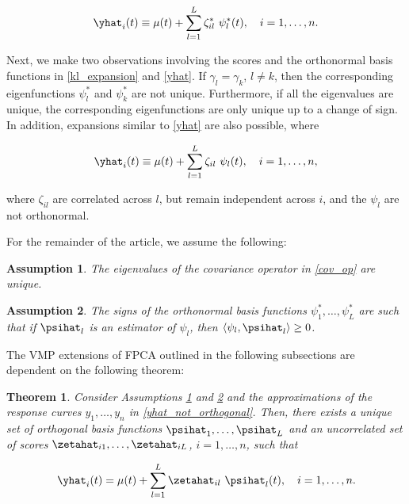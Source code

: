 \documentclass[12pt]{article}
\theoremstyle{plain}
\newtheorem{theorem}{Theorem}[section]
\newtheorem{assumption}{Assumption}
\theoremstyle{definition}
\theoremstyle{remark}
\begin{document}
\begin{equation}
	\yhat_i (t) \equiv \mu (t) + \sum_{l=1}^L \zeta^*_{il} \ \psi^*_l (t), \quad i = 1, \dots, n.
\label{yhat}
\end{equation}

Next, we make two observations involving the scores and the orthonormal basis functions in \eqref{kl_expansion}
and \eqref{yhat}.
If $\gamma_l = \gamma_k$, $l \neq k$, then the corresponding eigenfunctions $\psi^*_l$ and $\psi^*_k$ are not
unique. Furthermore, if all the eigenvalues are unique, the corresponding eigenfunctions are only unique up to
a change of sign. In addition, expansions similar to \eqref{yhat} are also possible, where

\begin{equation}
	\yhat_i (t) \equiv \mu (t) + \sum_{l=1}^L \zeta_{il} \ \psi_l (t), \quad i = 1, \dots, n,
\label{yhat_not_orthogonal}
\end{equation}

\noindent where $\zeta_{il}$ are correlated across $l$, but remain independent across $i$, and the $\psi_l$ are not
orthonormal.

For the remainder of the article, we assume the following:

\begin{assumption}
	
	The eigenvalues of the covariance operator in \eqref{cov_op} are unique.
	
\label{asspn:scores}
\end{assumption}

\begin{assumption}
	
	The signs of the orthonormal basis functions $\psi^*_1, \dots, \psi^*_L$ are such that if $\psihat_l$ is an
	estimator of $\psi_l$, then $\langle \psi_l , \psihat_l \rangle \ge 0$.
	
\label{asspn:signs}
\end{assumption}

The VMP extensions of FPCA outlined in the following subsections are dependent on the following theorem:

\begin{theorem}
	
	Consider Assumptions \ref{asspn:scores} and \ref{asspn:signs} and the approximations of the response
	curves $y_1, \dots, y_n$ in \eqref{yhat_not_orthogonal}. Then, there exists a unique set of orthogonal basis
	functions $\psihat_1, \dots, \psihat_L$ and an uncorrelated set of scores $\zetahat_{i1}, \dots, \zetahat_{iL}$,
	$i = 1, \dots, n$, such that
	
	\[
		\yhat_i (t) = \mu (t) + \sum_{l=1}^L \zetahat_{il} \ \psihat_l (t), \quad i = 1, \dots, n.
	\]
	
\label{thm:orth_basis}
\end{theorem}
\end{document}

